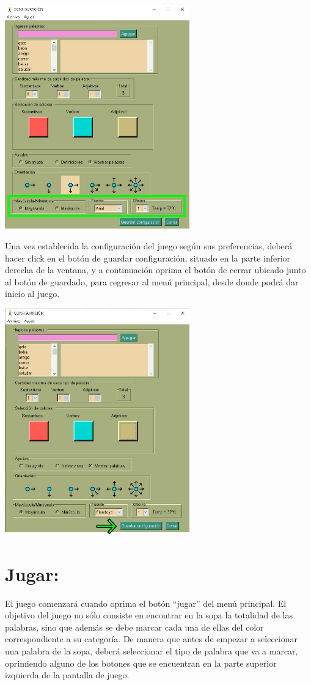 \includegraphics[width=0.6\textwidth,keepaspectratio]{img/guia/10.jpg}

Una vez establecida la configuración del juego según sus preferencias, deberá hacer click en el botón de guardar configuración, situado en la parte inferior derecha de la ventana, y a continuación oprima el botón de cerrar ubicado junto al botón de guardado, para regresar al menú principal, desde donde podrá dar inicio al juego.

\includegraphics[width=0.6\textwidth,keepaspectratio]{img/guia/11.jpg}

\section{Jugar:}
El juego comenzará cuando oprima el botón “jugar” del menú principal. El objetivo del juego no sólo consiste en encontrar en la sopa la totalidad de las palabras, sino que además se debe marcar cada una de ellas del color correspondiente a su categoría. De manera que antes de empezar a seleccionar una palabra de la sopa, deberá seleccionar el tipo de palabra que va a marcar, oprimiendo alguno de los botones que se encuentran en la parte superior izquierda de la pantalla de juego.

